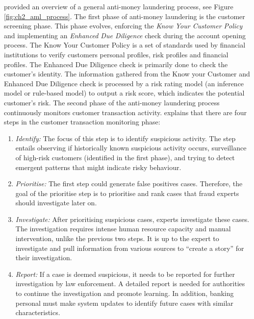 \citet*{sudjianto2010statistical} provided an overview of a general anti-money laundering process, see Figure \ref{fig:ch2_aml_process}. The first phase of anti-money laundering is the customer screening phase. This phase evolves, enforcing the \textit{Know Your Customer Policy} and implementing an \textit{Enhanced Due Diligence} check during the account opening process. The Know Your Customer Policy is a set of standards used by financial institutions to verify customers personal profiles, risk profiles and financial profiles. The Enhanced Due Diligence check is primarily done to check the customer's identity. The information gathered from the Know your Customer and Enhanced Due Diligence check is processed by a risk rating model (an inference model or rule-based model) to output a risk score, which indicates the potential customer's risk. The second phase of the anti-money laundering process continuously monitors customer transaction activity. \citet{sudjianto2010statistical} explains that there are four steps in the customer transaction monitoring phase:

\begin{enumerate}
    \item \textit{Identify:} The focus of this step is to identify suspicious activity. The step entails observing if historically known suspicious activity occurs, surveillance of high-risk customers (identified in the first phase), and trying to detect emergent patterns that might indicate risky behaviour.     
    
    \item \textit{Prioritise:} The first step could generate false positives cases. Therefore, the goal of the prioritise step is to prioritise and rank cases that fraud experts should investigate later on.
    
    \item \textit{Investigate:} After prioritising suspicious cases, experts investigate these cases. The investigation requires intense human resource capacity and manual intervention, unlike the previous two steps. It is up to the expert to investigate and pull information from various sources to ``create a story'' for their investigation.    
    
    \item \textit{Report:} If a case is deemed suspicious, it needs to be reported for further investigation by law enforcement. A detailed report is needed for authorities to continue the investigation and promote learning. In addition, banking personal must make system updates to identify future cases with similar characteristics.    
    
\end{enumerate}

